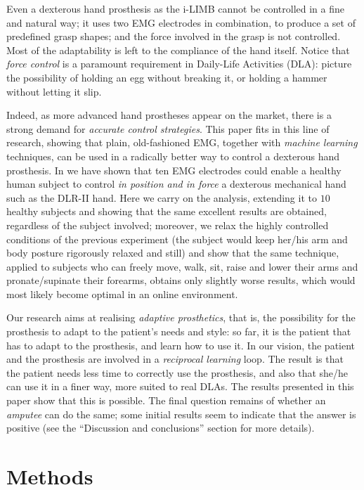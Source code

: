 \documentclass[10pt]{bmc_article}
\newenvironment{bmcformat}{\begin{raggedright}\baselineskip20pt\sloppy\setboolean{publ}{false}}{\end{raggedright}\baselineskip20pt\sloppy}
\begin{document}
\begin{bmcformat}
Even a dexterous hand prosthesis as the i-LIMB cannot be controlled in
a fine and natural way; it uses two EMG electrodes in combination, to
produce a set of predefined grasp shapes; and the force involved in
the grasp is not controlled. Most of the adaptability is left to the
compliance of the hand itself. Notice that \emph{force control} is a
paramount requirement in Daily-Life Activities (DLA): picture the
possibility of holding an egg without breaking it, or holding a hammer
without letting it slip.

Indeed, as more advanced hand prostheses appear on the market, there
is a strong demand for \emph{accurate control strategies}. This paper
fits in this line of research, showing that plain, old-fashioned EMG,
together with \emph{machine learning} techniques, can be used in a
radically better way to control a dexterous hand prosthesis. In
\cite{2008.ICRA,2008.BioCyb} we have shown that ten EMG electrodes
could enable a healthy human subject to control \emph{in position and
in force} a dexterous mechanical hand such as the DLR-II hand. Here we
carry on the analysis, extending it to $10$ healthy subjects and
showing that the same excellent results are obtained, regardless of
the subject involved; moreover, we relax the highly controlled
conditions of the previous experiment (the subject would keep her/his
arm and body posture rigorously relaxed and still) and show that the
same technique, applied to subjects who can freely move, walk, sit,
raise and lower their arms and pronate/supinate their forearms,
obtains only slightly worse results, which would most likely become
optimal in an online environment.

Our research aims at realising \emph{adaptive prosthetics}, that is,
the possibility for the prosthesis to adapt to the patient's needs and
style: so far, it is the patient that has to adapt to the prosthesis,
and learn how to use it. In our vision, the patient and the prosthesis
are involved in a \emph{reciprocal learning} loop. The result is that
the patient needs less time to correctly use the prosthesis, and also
that she/he can use it in a finer way, more suited to real DLAs. The
results presented in this paper show that this is possible. The final
question remains of whether an
\emph{amputee} can do the same; some initial results seem to indicate
that the answer is positive (see the ``Discussion and conclusions''
section for more details).

\section*{Methods}
\label{sec:m&ms}


\end{bmcformat}
\end{document}
